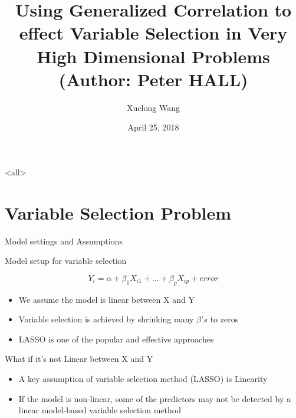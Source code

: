 \documentclass[ignorenonframetext,]{beamer}
\author[
Xuelong Wang
]{Xuelong Wang}
\date[
04/25/2018
]{
April 25, 2018
}
\providecommand{\tightlist}{%
  \setlength{\itemsep}{0pt}\setlength{\parskip}{0pt}}
\begin{document}
\mode<all>{
\title[
STAT 591 Generalized Correlation
]{
Using Generalized Correlation to effect Variable Selection in Very High
Dimensional Problems \newline (Author: Peter HALL)
}
}
\mode*

\frame{\titlepage}


\section{Variable Selection Problem}\label{variable-selection-problem}

\begin{frame}{Model settings and Assumptions}

\begin{block}{Model setup for variable selection}

\[
  Y_i = \alpha + \beta_1X_{i1} + \dots + \beta_{p}X_{ip} + error
\]

\end{block}

\begin{itemize}
\tightlist
\item
  We assume the model is linear between X and Y
\item
  Variable selection is achieved by shrinking many \(\beta's\) to zeros
\item
  LASSO is one of the popular and effective approaches
\end{itemize}

\end{frame}

\begin{frame}{What if it's not Linear between X and Y}

\begin{itemize}
\tightlist
\item
  A key assumption of variable selection method (LASSO) is Linearity
\item
  If the model is non-linear, some of the predictors may not be detected
  by a linear model-based variable selection method
\end{itemize}

\end{frame}
\end{document}
